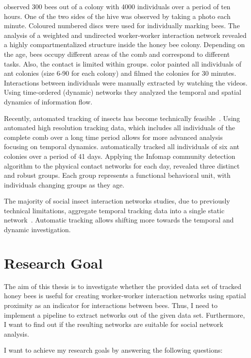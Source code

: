 \textcite{baracchi2014socio} observed 300 bees out of a colony with 4000 individuals over a period of ten hours. One of the two sides of the hive was observed by taking a photo each minute. Coloured numbered discs were used for individually marking bees. The analysis of a weighted and undirected worker-worker interaction network revealed a highly compartmentalized structure inside the honey bee colony. Depending on the age, bees occupy different areas of the comb and correspond to different tasks. Also, the contact is limited within groups. \textcite{blonder2011time} color painted all individuals of ant colonies (size 6-90 for each colony) and filmed the colonies for 30 minutes. Interactions between individuals were manually extracted by watching the videos. Using time-ordered (dynamic) networks they analyzed the temporal and spatial dynamics of information flow.

Recently, automated tracking of insects has become technically feasible~\cite{wario2015automatic, crall2015beetag, fiala2005comparing}.
Using automated high resolution tracking data, which includes all individuals of the complete comb over a long time period allows for more advanced analysis focusing on temporal dynamics.
\textcite{mersch2013tracking} automatically tracked all individuals of six ant colonies over a period of 41 days. Applying the Infomap community detection algorithm to the physical contact networks for each day, revealed three distinct and robust groups. Each group represents a functional behavioral unit, with individuals changing groups as they age.

The majority of social insect interaction networks studies, due to previously technical limitations, aggregate temporal tracking data into a single static network~\cite[Chapter~15]{krause2014animal}.
Automatic tracking allows shifting more towards the temporal and dynamic investigation.


\section{Research Goal}
The aim of this thesis is to investigate whether the provided data set of tracked honey bees is useful for creating worker-worker interaction networks using spatial proximity as an indicator for interactions between bees. Thus, I need to implement a pipeline to extract networks out of the given data set. Furthermore, I want to find out if the resulting networks are suitable for social network analysis.

I want to achieve my research goals by answering the following questions:

